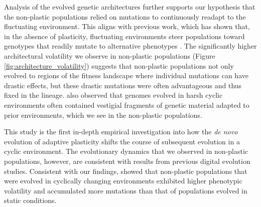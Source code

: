 Analysis of the evolved genetic architectures further supports our hypothesis that the non-plastic populations relied on mutations to continuously readapt to the fluctuating environment. 
This aligns with previous work, which has shown that, in the absence of plasticity, fluctuating environments steer populations toward genotypes that readily mutate to alternative phenotypes \citep{lalejini_evolutionary_2016, canino-koning_fluctuating_2019}.
The significantly higher architectural volatility we observe in non-plastic populations (Figure \ref{fig:architecture_volatility}) suggests that non-plastic populations not only evolved to regions of the fitness landscape where individual mutations can have drastic effects, but these drastic mutations were often advantageous and thus fixed in the lineage. 
\cite{canino-koning_fluctuating_2019} also observed that genomes evolved in harsh cyclic environments often contained vestigial fragments of genetic material adapted to prior environments, which we see in the non-plastic populations.


This study is the first in-depth empirical investigation into how the \textit{de novo} evolution of adaptive plasticity shifts the course of subsequent evolution in a cyclic environment.
The evolutionary dynamics that we observed in non-plastic populations, however, are consistent with results from previous digital evolution studies. %
Consistent with our findings, \cite{dolson_interpreting_2020} showed that non-plastic populations that were evolved in cyclically changing environments exhibited higher phenotypic volatility and accumulated more mutations than that of populations evolved in static conditions.


